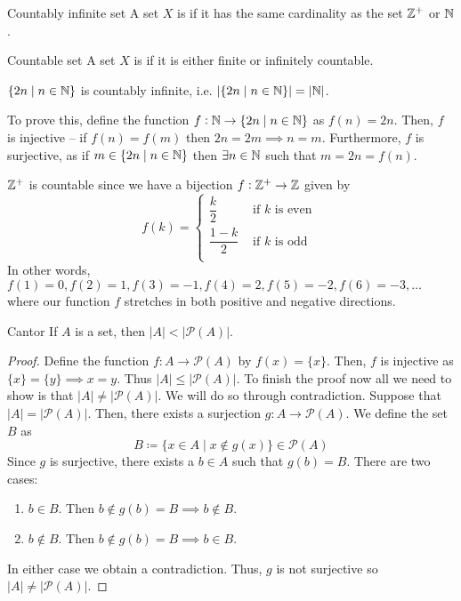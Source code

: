 \begin{defn}{Countably infinite set}{}
A set $X$ is  if it has the same cardinality as the set $\mathbb Z^{+}$ or $\mathbb N$.
\end{defn}

\begin{defn}{Countable set}{}
A set $X$ is  if it is either finite or infinitely countable.
\end{defn}

\begin{exmp}{}{}
$\{2n \mid n \in \mathbb N\}$ is countably infinite, i.e. $|\{2n \mid n \in \mathbb N\}| = |\mathbb N|$. 

To prove this, define the function $f:\mathbb N \to \{2n \mid n \in \mathbb N\}$ as $f(n) = 2n$. Then, $f$ is injective -- if $f(n) = f(m)$ then $2n=2m \implies n=m$. Furthermore, $f$ is surjective, as if $m \in \{2n \mid n \in \mathbb N\}$ then $\exists n \in \mathbb N$ such that $m = 2n = f(n)$.
\end{exmp}

\begin{exmp}{}{}
$\mathbb Z^{+}$ is countable since we have a bijection $f:\mathbb Z^{+}\to\mathbb Z$ given by
\[ f(k)=\begin{cases}
    \dfrac{k}{2} & \text{ if } k \text{ is even } \\
    \dfrac{1-k}{2} & \text{ if } k \text{ is odd } \\
\end{cases} \]
In other words, $f(1)=0, f(2)=1, f(3)=-1, f(4)=2, f(5)=-2, f(6)=-3, \dots$ where our function $f$ stretches in both positive and negative directions.
\end{exmp}

\begin{thrm}{Cantor}{}
If $A$ is a set, then $|A|<|\mathcal{P}(A)|$.
\end{thrm}
\begin{proof}
Define the function $f:A \to \mathcal{P}(A)$ by $f(x) = \{x\}$. Then, $f$ is injective as $\{x\}=\{y\} \implies x=y$. Thus $|A| \le |\mathcal{P}(A)|$. To finish the proof now all we need to show is that $|A| \neq |\mathcal{P}(A)|$. We will do so through contradiction. Suppose that $|A| = |\mathcal{P}(A)|$. Then, there exists a surjection $g:A \to \mathcal{P}(A)$. We define the set $B$ as
\[ B \coloneq \{x \in A \mid x \notin g(x)\} \in \mathcal{P}(A) \]
Since $g$ is surjective, there exists a $b \in A$ such that $g(b) = B$. There are two cases:
\begin{enumerate}
\item $b \in B$. Then $b \notin g(b) = B \implies b \notin B$.
\item $b \notin B$. Then $b \notin g(b) = B \implies b \in B$.
\end{enumerate}
In either case we obtain a contradiction. Thus, $g$ is not surjective so $|A| \neq |\mathcal{P}(A)|$.
\end{proof}

